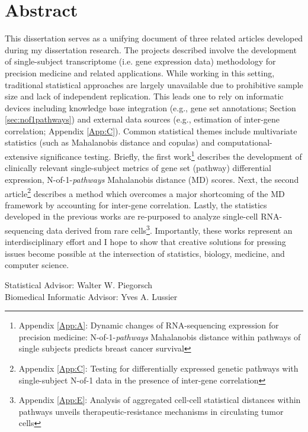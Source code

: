\documentclass[final]{ua-thesis}
\numberwithin{equation}{section}
\begin{document}
\chapter*{Abstract}
\noindent This dissertation serves as a unifying document of three related articles developed during my dissertation research. The projects described involve the development of single-subject transcriptome (i.e. gene expression data) methodology for precision medicine and related applications. While working in this setting, traditional statistical approaches are largely unavailable due to prohibitive sample size and lack of independent replication. This leads one to rely on informatic devices including knowledge base integration (e.g., gene set annotations; Section \ref{sec:nof1pathways}) and external data sources (e.g., estimation of inter-gene correlation; Appendix \ref{App:C}). Common statistical themes include multivariate statistics (such as Mahalanobis distance and copulas) and computational-extensive significance testing. Briefly, the first work\footnote{Appendix \ref{App:A}: Dynamic changes of RNA-sequencing expression for precision medicine: N-of-1-\emph{pathways} Mahalanobis distance within pathways of single subjects predicts breast cancer survival} describes the development of clinically relevant single-subject metrics of gene set (pathway) differential expression, N-of-1-\emph{pathways} Mahalanobis distance (MD) scores. Next, the second article\footnote{Appendix \ref{App:C}: Testing for differentially expressed genetic pathways with single-subject N-of-1 data in the presence of inter-gene correlation} describes a method which overcomes a major shortcoming of the MD framework by accounting for inter-gene correlation. Lastly, the statistics developed in the previous works are re-purposed to analyze single-cell RNA-sequencing data derived from rare cells\footnote{Appendix \ref{App:E}: Analysis of aggregated cell-cell statistical distances within pathways unveils therapeutic-resistance mechanisms in circulating tumor cells}. Importantly, these works represent an interdisciplinary effort and I hope to show that creative solutions for pressing issues become possible at the intersection of statistics, biology, medicine, and computer science.

\vspace{2.5pc}

\noindent Statistical Advisor: Walter W. Piegorsch\\
Biomedical Informatic Advisor: Yves A. Lussier






\end{document}
